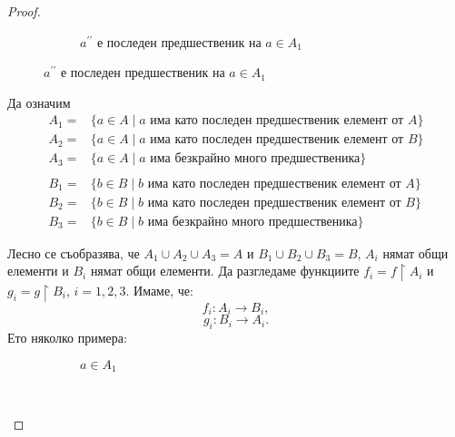\begin{proof}
\begin{figure}[htbp]
\begin{subfigure}[b]{0.6\textwidth}
    \caption{$a^{\prime\prime}$ е последен предшественик на $a\in A_1$}
  \end{subfigure}
\end{figure}

Да означим 
\begin{align*}
  A_1 = & \{a\in A \mid a \mbox{ има като последен предшественик елемент от } A\}\\
  A_2 = & \{a\in A \mid a \mbox{ има като последен предшественик елемент от } B\}\\
  A_3 = & \{a\in A \mid a \mbox{ има безкрайно много предшественика} \}\\
  \\
  B_1 = & \{b\in B \mid b \mbox{ има като последен предшественик елемент от } A\}\\
  B_2 = & \{b\in B \mid b \mbox{ има като последен предшественик елемент от } B\}\\
  B_3 = & \{b\in B \mid b \mbox{ има безкрайно много предшественика} \}
\end{align*}
    
Лесно се съобразява, че $A_1\cup A_2\cup A_3 = A$ и $B_1\cup B_2\cup B_3 = B$,
$A_i$ нямат общи елементи и $B_i$ нямат общи елементи.
Да разгледаме функциите $f_i = f\upharpoonright{A_i}$ и $g_i = g\upharpoonright{B_i}$, $i = 1,2,3$. Имаме, че:
\[f_i:A_i\to B_i,\]
\[g_i:B_i\to A_i.\]
Ето няколко примера:
\begin{figure}[htbp]
\centering
\begin{subfigure}[b]{0.3\textwidth}
  \caption{$a \in A_1$}
\end{subfigure}
\qquad
~
\qquad
\begin{subfigure}[b]{0.5\textwidth}
\end{subfigure}
\end{figure}
\end{proof}
